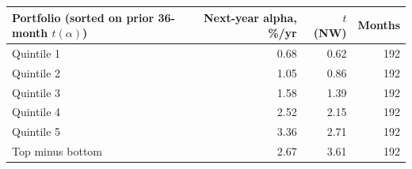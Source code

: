 \begin{tabular}{lrrr}
\toprule
Portfolio (sorted on prior 36-month $t(\alpha)$) & Next-year alpha, \%/yr & $t$ (NW) & Months \\
\midrule
Quintile 1 & 0.68 & 0.62 & 192 \\
Quintile 2 & 1.05 & 0.86 & 192 \\
Quintile 3 & 1.58 & 1.39 & 192 \\
Quintile 4 & 2.52 & 2.15 & 192 \\
Quintile 5 & 3.36 & 2.71 & 192 \\
Top minus bottom & 2.67 & 3.61 & 192 \\
\bottomrule
\end{tabular}
